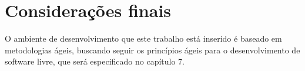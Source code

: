 \section{Considerações finais}

O ambiente de desenvolvimento que este trabalho está inserido é baseado em metodologias ágeis, buscando seguir os princípios ágeis para o desenvolvimento de software livre, que será especificado no capítulo 7.




